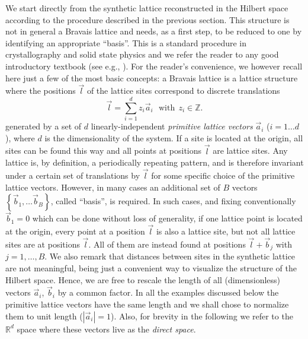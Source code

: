 \documentclass[prl,aps,twocolumn,showpacs,superscriptaddress,longbibliography]{revtex4-1}
\newcommand{\be}{\begin{equation}}
\newcommand{\ee}{\end{equation}}
\newcommand{\abs}[1]{\left| #1 \right|}
\newcommand{\set}[1]{\left\{  #1  \right\}}
\newcommand{\R}{\mathbb{R}}
\newcommand{\Z}{\mathbb{Z}}
\begin{document}
We start directly from the synthetic lattice reconstructed in the Hilbert space according to the procedure described in the previous section. This structure is not in general a Bravais lattice and needs, as a first step, to be reduced to one by identifying an appropriate ``basis''. This is a standard procedure in crystallography and solid state physics and we refer the reader to any good introductory textbook (see e.g., \cite{Grosso}). For the reader's convenience, we however recall here just a few of the most basic concepts: a Bravais lattice is a lattice structure where the positions $\vec{l}$ of the lattice sites correspond to discrete translations 
\be
	\vec{l} = \sum_{i=1}^d z_i \vec{a}_i  \ \ \ \text{with} \ \ z_i \in \Z.
	\label{eq:realvec}
\ee
generated by a set of $d$ linearly-independent \emph{primitive lattice vectors} $\vec{a}_i$ ($i = 1 \ldots d$), where $d$ is the dimensionality of the system. If a site is located at the origin, all sites can be found this way and all points at positions $\vec{l}$ are lattice sites. Any lattice is, by definition, a periodically repeating pattern, and is therefore invariant under a certain set of translations by $\vec{l}$ for some specific choice of the primitive lattice vectors. However, in many cases an additional set of $B$ vectors $\set{\vec{b}_1 , \ldots \vec{b}_B}$, called ``basis'', is required. In such cases, and fixing conventionally $\vec{b}_1 = 0$ which can be done without loss of generality, if one lattice point is located at the origin, every point at a position $\vec{l}$ is also a lattice site, but not all lattice sites are at positions $\vec{l}$. All of them are instead found at positions $\vec{l} + \vec{b}_j$ with $j =1, \ldots ,B$. We also remark that distances between sites in the synthetic lattice are not meaningful, being just a convenient way to visualize the structure of the Hilbert space. Hence, we are free to rescale the length of all (dimensionless) vectors $\vec{a}_i$, $\vec{b}_i$ by a common factor. In all the examples discussed below the primitive lattice vectors have the same length and we shall chose to normalize them to unit length ($\abs{\vec{a}_i} = 1$). Also, for brevity in the following we refer to the $\R^d$ space where these vectors live as the \emph{direct space}.
\end{document}
